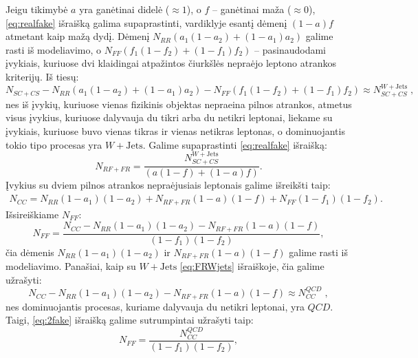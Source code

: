 \documentclass[a4paper, 12pt, oneside]{article}
\newcommand{\WJets}{W\! +\!\mathrm{Jets}}
\newcommand{\QCD}{QC\! D}
\newlength\q
\begin{document}
Jeigu tikimybė $a$ yra ganėtinai didelė ($\approx \!1$), o $f$ -- ganėtinai maža ($\approx \!0$), \eqref{eq:realfake} išraišką galima
supaprastinti, vardiklyje esantį dėmenį $(1-a)f$ atmetant kaip mažą dydį.
Dėmenį $N_{RR} \left( a_1(1-a_2) + (1-a_1)a_2 \right)$ galime rasti iš modeliavimo, o $N_{FF} (f_1(1-f_2)+(1-f_1)f_2)$ -- pasinaudodami
įvykiais, kuriuose dvi klaidingai atpažintos čiurkšlės nepraėjo leptono atrankos kriterijų.
Iš tiesų:
\begin{equation}
\label{eq:FRWjets}
	N_{SC\!+\!CS} - N_{RR} \left( a_1(1-a_2) + (1-a_1)a_2 \right) - N_{FF} \left(f_1(1-f_2)+(1-f_1)f_2 \right) \approx N_{SC\!+\!CS}^{\WJets} \; ,
\end{equation}
nes iš įvykių, kuriuose vienas fizikinis objektas nepraeina pilnos atrankos, atmetus visus įvykius, kuriuose dalyvauja du tikri
arba du netikri leptonai, liekame su įvykiais, kuriuose buvo vienas tikras ir vienas netikras leptonas, o dominuojantis tokio tipo
procesas yra $\WJets$.
Galime supaprastinti \eqref{eq:realfake} išraišką:
\begin{equation}
\label{eq:realfakeSimple}
	N_{RF\!+\!FR} = \frac{ N_{SC\!+\!CS}^{\WJets} }
				   		 { (a(1-f)+(1-a)f) }.
\end{equation}
Įvykius su dviem pilnos atrankos nepraėjusiais leptonais galime išreikšti taip:
\begin{equation}
\label{eq:2fail}
	\begin{gathered}
		N_{CC} = N_{RR} (1-a_1)(1-a_2) + N_{RF\!+\!FR} (1-a)(1-f) + N_{FF} (1-f_1)(1-f_2).
	\end{gathered}
\end{equation}
Išsireiškiame $N_{FF}$:
\begin{equation}
\label{eq:2fake}
	N_{FF} = \frac{ N_{CC} - N_{RR} (1-a_1)(1-a_2) - N_{RF\!+\!FR} (1-a)(1-f) }
					 { (1-f_1)(1-f_2) },
\end{equation}
čia dėmenis $N_{RR} (1-a_1)(1-a_2)$ ir $N_{RF\!+\!FR} (1-a)(1-f)$ galime rasti iš modeliavimo.
Panašiai, kaip su $\WJets$ \eqref{eq:FRWjets} išraiškoje, čia galime užrašyti:
\begin{equation}
\label{eq:FRQCD}
	N_{CC} - N_{RR} (1-a_1)(1-a_2) - N_{RF\!+\!FR} (1-a)(1-f) \approx N_{CC}^{\QCD} \; ,
\end{equation}
nes dominuojantis procesas, kuriame dalyvauja du netikri leptonai, yra $\QCD$.
Taigi, \eqref{eq:2fake} išraišką galime sutrumpintai užrašyti taip:
\begin{equation}
\label{eq:2fakeSimple}
	N_{FF} = \frac{ N_{CC}^{\QCD} }
				  { (1-f_1)(1-f_2) },
\end{equation}
\end{document}
